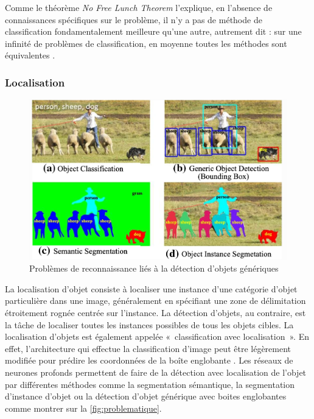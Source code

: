 Comme le théorème \textit{No Free Lunch Theorem} l'explique, en l’absence de connaissances spécifiques sur le problème, il n’y a pas de méthode de classification fondamentalement meilleure qu'une autre, autrement dit : sur une infinité de problèmes de classification, en moyenne toutes les méthodes sont équivalentes \cite{wolpert_no_1997}.

\subsubsection{Localisation}
\begin{figure}[ht!]
    \centering
    \includegraphics[width=0.6\linewidth]{Rapport/images/problematique.png}
    \caption{Problèmes de reconnaissance liés à la détection d'objets génériques}
    \label{fig:problematique}
\end{figure}

La localisation d'objet consiste à localiser une instance d'une catégorie d'objet particulière dans une image, généralement en spécifiant une zone de délimitation étroitement rognée centrée sur l'instance. La détection d'objets, au contraire, est la tâche de localiser toutes les instances possibles de tous les objets cibles.
La localisation d'objets est également appelée « classification avec localisation ». En effet, l'architecture qui effectue la classification d'image peut être légèrement modifiée pour prédire les coordonnées de la boîte englobante \cite{liu_deep_2019}. 
Les réseaux de neurones profonds permettent de faire de la détection avec localisation de l'objet par différentes méthodes comme la segmentation sémantique, la segmentation d'instance d'objet ou la détection d'objet générique avec boites englobantes comme montrer sur la \autoref{fig:problematique}.

